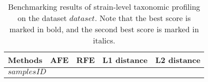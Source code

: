 
\begin{table}[ht]
\renewcommand\arraystretch{1.}
    \centering
    \small
    \setlength\tabcolsep{2pt} 
    \begin{tabular}{p{} p{}<{\centering} p{}<{\centering} p{1.5cm}<{\centering} p{1.5cm}<{\centering}}

    \toprule
    Methods & AFE & RFE & L1 distance & L2 distance \\ 
    \midrule
    \multicolumn{4}{l}{$samplesID$} \\
    \hline     
\bottomrule
    \end{tabular}
    \vspace{1mm}
    \caption{Benchmarking results of strain-level taxonomic profiling on the dataset $dataset$. Note that the best score is marked in bold, and the second best score is marked in italics.}
    \label{tab:res_strain_$dataset$}
\end{table}
    